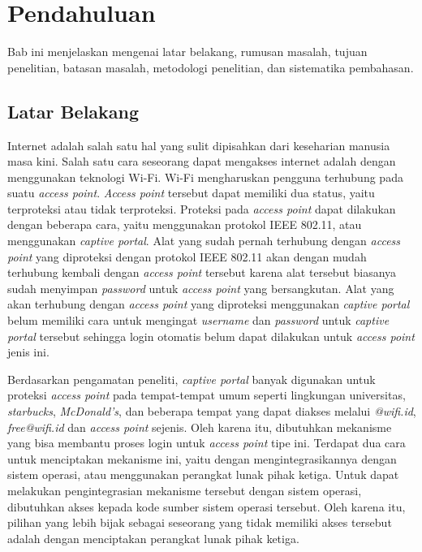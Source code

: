 \chapter{Pendahuluan}
\label{chap:pendahuluan}

Bab ini menjelaskan mengenai latar belakang, rumusan masalah, tujuan penelitian, batasan masalah, metodologi penelitian, dan sistematika pembahasan.



\section{Latar Belakang}
\label{sec:latar_belakang}

Internet adalah salah satu hal yang sulit dipisahkan dari keseharian manusia masa kini. Salah satu cara seseorang dapat mengakses internet adalah dengan menggunakan teknologi Wi-Fi. Wi-Fi mengharuskan pengguna terhubung pada suatu \textit{access point}. \textit{Access point} tersebut dapat memiliki dua status, yaitu terproteksi atau tidak terproteksi. Proteksi pada \textit{access point} dapat dilakukan dengan beberapa cara, yaitu menggunakan protokol IEEE 802.11, atau menggunakan \textit{captive portal}. Alat yang sudah pernah terhubung dengan \textit{access point} yang diproteksi dengan protokol IEEE 802.11 akan dengan mudah terhubung kembali dengan \textit{access point} tersebut karena alat tersebut biasanya sudah menyimpan \textit{password} untuk \textit{access point} yang bersangkutan. Alat yang akan terhubung dengan \textit{access point} yang diproteksi menggunakan \textit{captive portal} belum memiliki cara untuk mengingat \textit{username} dan \textit{password} untuk \textit{captive portal} tersebut sehingga login otomatis belum dapat dilakukan untuk \textit{access point} jenis ini.

Berdasarkan pengamatan peneliti, \textit{captive portal} banyak digunakan untuk proteksi \textit{access point} pada tempat-tempat umum seperti lingkungan universitas, \textit{starbucks}, \textit{McDonald's}, dan beberapa tempat yang dapat diakses melalui \textit{@wifi.id}, \textit{free@wifi.id} dan \textit{access point} sejenis. Oleh karena itu, dibutuhkan mekanisme yang bisa membantu proses login untuk \textit{access point} tipe ini. Terdapat dua cara untuk menciptakan mekanisme ini, yaitu dengan mengintegrasikannya dengan sistem operasi, atau menggunakan perangkat lunak pihak ketiga. Untuk dapat melakukan pengintegrasian mekanisme tersebut dengan sistem operasi, dibutuhkan akses kepada kode sumber sistem operasi tersebut. Oleh karena itu, pilihan yang lebih bijak sebagai seseorang yang tidak memiliki akses tersebut adalah dengan menciptakan perangkat lunak pihak ketiga.



